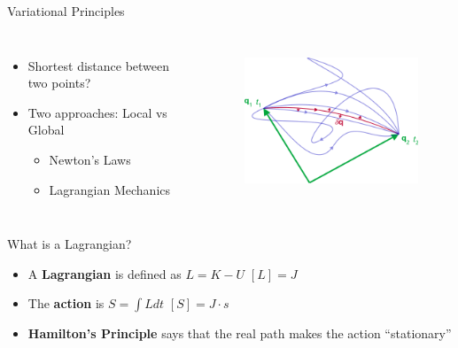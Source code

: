 \documentclass[10pt,xcolor={table,dvipsnames},t]{beamer}
\begin{document}
\begin{frame}{Variational Principles}
\begin{columns}[c]

    \begin{itemize}
        \item Shortest distance between two points?
        \item Two approaches: Local vs Global
        \begin{itemize}
            \item Newton's Laws
            \item Lagrangian Mechanics
        \end{itemize}
    \end{itemize}
    
\begin{figure}
    \centering
    \includegraphics[scale=0.5]{least_action_paths.png}
    \label{fig:paths}
\end{figure}

\end{columns}
    
\end{frame}

\begin{frame}{What is a Lagrangian?}
    \begin{itemize}
        \item A \textbf{Lagrangian} is defined as $L = K - U$ \hfill $[L] = J$
        \item The \textbf{action} is $S = \int L dt$ \hfill $[S] = J\cdot s$
        \pause \item \textbf{Hamilton's Principle} says that the real path makes the action ``stationary''
        \vspace{90pt}
    \end{itemize}
\end{frame}
\end{document}
